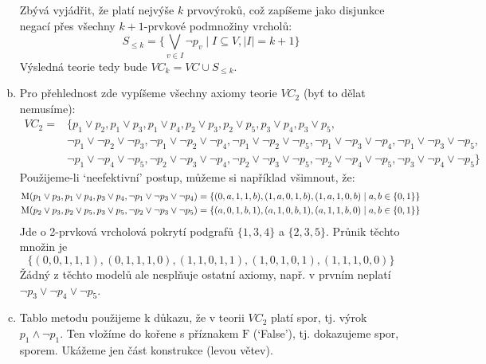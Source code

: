 \documentclass[a4paper,11pt]{amsart}
\begin{document}
\begin{problem}
\begin{solution}
\begin{enumerate}[(a)]
            Zbývá vyjádřit, že platí nejvýše $k$ prvovýroků, což zapíšeme jako disjunkce negací přes všechny $k+1$-prvkové podmnožiny vrcholů:
            $$
            S_{\leq k}=\{\bigvee_{v\in I} \neg p_v\mid I\subseteq V,|I|=k+1\}
            $$
            Výsledná teorie tedy bude $VC_k=VC\cup S_{\leq k}$.
            \item Pro přehlednost zde vypíšeme všechny axiomy teorie $VC_2$ (byť to dělat nemusíme):
            \begin{align*}
                VC_2=&\{p_1\lor p_2,p_1\lor p_3,p_1\lor p_4,p_2\lor p_3,p_2\lor p_5,p_3\lor p_4,p_3\lor p_5,\\
                &\neg p_1\lor\neg p_2\lor\neg p_3,\neg p_1\lor\neg p_2\lor\neg p_4,
                \neg p_1\lor\neg p_2\lor\neg p_5,\neg p_1\lor\neg p_3\lor\neg p_4,
                \neg p_1\lor\neg p_3\lor\neg p_5,\\ &\neg p_1\lor\neg p_4\lor\neg p_5,
                \neg p_2\lor\neg p_3\lor\neg p_4,\neg p_2\lor\neg p_3\lor\neg p_5,
                \neg p_2\lor\neg p_4\lor\neg p_5,\neg p_3\lor\neg p_4\lor\neg p_5\}
            \end{align*}
            Použijeme-li `neefektivní' postup, můžeme si například všimnout, že:
            \begin{align*}
                \operatorname{M}(p_1\lor p_3,p_1\lor p_4,p_3\lor p_4,\neg p_1\lor\neg p_3\lor\neg p_4)&=\{(0,a,1,1,b),(1,a,0,1,b),(1,a,1,0,b)\mid a,b\in\{0,1\}\}\\
                \operatorname{M}(p_2\lor p_3,p_2\lor p_5,p_3\lor p_5,\neg p_2\lor\neg p_3\lor\neg p_5)&=\{(a,0,1,b,1),(a,1,0,b,1),(a,1,1,b,0)\mid a,b\in\{0,1\}\}\\
            \end{align*}
            Jde o 2-prvková vrcholová pokrytí podgrafů $\{1,3,4\}$ a $\{2,3,5\}$. Průnik těchto množin je
            $$
                \{(0,0,1,1,1),(0,1,1,1,0),(1,1,0,1,1),(1,0,1,0,1),(1,1,1,0,0)\}
            $$
            Žádný z těchto modelů ale nesplňuje ostatní axiomy, např. v prvním neplatí $\neg p_3\lor\neg p_4\lor\neg p_5$.
            \item Tablo metodu použijeme k důkazu, že v teorii $VC_2$ platí spor, tj. výrok $p_1\land \neg p_1$. Ten vložíme do kořene s příznakem $\mathrm{F}$ (`False'), tj. dokazujeme spor, sporem. Ukážeme jen část konstrukce (levou větev).
           

\end{enumerate}
\end{solution}
\end{problem}
\end{document}
